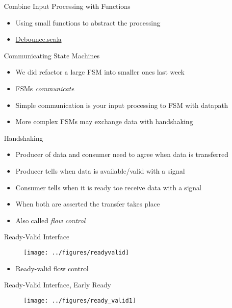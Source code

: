 \begin{frame}[fragile]{Combine Input Processing with Functions}
\begin{itemize}
\item Using small functions to abstract the processing
\item \href{https://github.com/schoeberl/chisel-book/blob/master/src/main/scala/Debounce.scala}{Debounce.scala}
\end{itemize}
\end{frame}

\begin{frame}[fragile]{Communicating State Machines}
\begin{itemize}
\item We did refactor a large FSM into smaller ones last week
\item FSMs \emph{communicate}
\item Simple communication is your input processing to FSM with datapath
\item More complex FSMs may exchange data with handshaking
\end{itemize}
\end{frame}

\begin{frame}[fragile]{Handshaking}
\begin{itemize}
\item Producer of data and consumer need to agree when data is transferred
\item Producer tells when data is available/valid with a  signal
\item Consumer tells when it is ready toe receive data with a  signal
\item When both are asserted the transfer takes place
\item Also called \emph{flow control}
\end{itemize}
\end{frame}

\begin{frame}[fragile]{Ready-Valid Interface}
\begin{figure}
  \texttt{[image: ../figures/readyvalid]}
\end{figure}
\begin{itemize}
\item Ready-valid flow control
\end{itemize}
\end{frame}

\begin{frame}[fragile]{Ready-Valid Interface, Early Ready}
\begin{figure}
  \texttt{[image: ../figures/ready\_valid1]}
\end{figure}
\end{frame}

